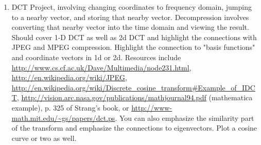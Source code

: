 \begin{enumerate}
\item DCT Project, involving changing coordinates to frequency domain,
  jumping to a nearby vector, and storing that nearby vector.
  Decompression involves converting that nearby vector into the time
  domain and viewing the result.  Should cover 1-D DCT as well as 2d
  DCT and highlight the connections with JPEG and MPEG compression.
  Highlight the connection to "basis functions" and coordinate vectors
  in 1d or 2d.  Resources include
  \url{http://www.cs.cf.ac.uk/Dave/Multimedia/node231.html},
  \url{http://en.wikipedia.org/wiki/JPEG},
  \url{http://en.wikipedia.org/wiki/Discrete_cosine_transform#Example_of_IDCT},
  \url{http://vision.arc.nasa.gov/publications/mathjournal94.pdf}
  (mathematica example), p. 325 of Strang's book, or
  \url{http://www-math.mit.edu/~gs/papers/dct.ps}.  You can also
  emphasize the similarity part of the transform and emphasize the
  connections to eigenvectors.  Plot a cosine curve or two as well.
\end{enumerate}


